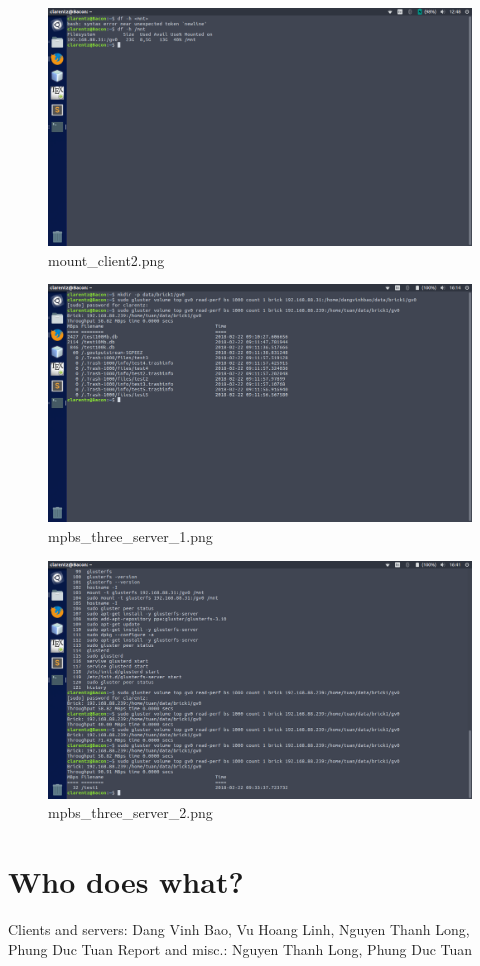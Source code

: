 \documentclass{article}
\begin{document}
\begin{figure}[h!]
\centering
\includegraphics[scale=0.5]{mount_client2.png}
\caption{mount_client2.png}
\label{fig:glusterfsfigure}
\end{figure}

\begin{figure}[h!]
\centering
\includegraphics[scale=0.5]{mpbs_three_server_1.png}
\caption{mpbs_three_server_1.png}
\label{fig:glusterfsfigure}
\end{figure}

\begin{figure}[h!]
\centering
\includegraphics[scale=0.5]{mpbs_three_server_2.png}
\caption{mpbs_three_server_2.png}
\label{fig:glusterfsfigure}
\end{figure}

\section{Who does what?}
Clients and servers: Dang Vinh Bao, Vu Hoang Linh, Nguyen Thanh Long, Phung Duc Tuan
Report and misc.: Nguyen Thanh Long, Phung Duc Tuan
\end{document}
